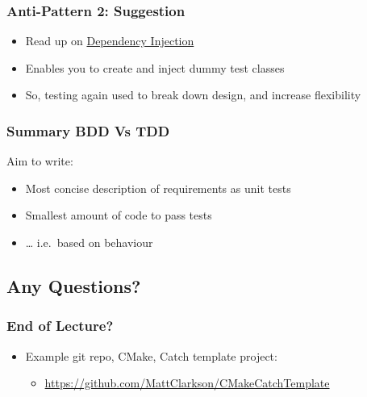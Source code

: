 \subsubsection{Anti-Pattern 2:
Suggestion}\label{anti-pattern-2-suggestion}

\begin{itemize}
\itemsep1pt\parskip0pt
\item
  Read up on
  \href{https://martinfowler.com/articles/injection.html}{Dependency
  Injection}
\item
  Enables you to create and inject dummy test classes
\item
  So, testing again used to break down design, and increase flexibility
\end{itemize}

\subsubsection{Summary BDD Vs TDD}\label{summary-bdd-vs-tdd}

Aim to write:

\begin{itemize}
\itemsep1pt\parskip0pt
\item
  Most concise description of requirements as unit tests
\item
  Smallest amount of code to pass tests
\item
  \ldots{} i.e.~based on behaviour
\end{itemize}

\subsection{Any Questions?}\label{any-questions}

\subsubsection{End of Lecture?}\label{end-of-lecture}

\begin{itemize}
\itemsep1pt\parskip0pt
\item
  Example git repo, CMake, Catch template project:

  \begin{itemize}
  \itemsep1pt\parskip0pt
  \item
    \url{https://github.com/MattClarkson/CMakeCatchTemplate}
  \end{itemize}
\end{itemize}

